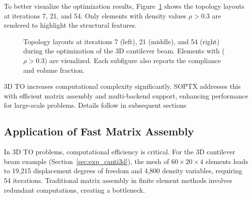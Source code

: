 \documentclass[mathpazo]{cicp}
\begin{document}
To better visualize the optimization results, Figure~\ref{fig:canti3d_all} shows the topology layouts at iterations 7, 21, and 54. Only elements with density values $\rho>0.3$ are rendered to highlight the structural features.
\begin{figure}[htb]
	\centering
	\caption{Topology layouts at iterations 7 (left), 21 (middle), and 54 (right) during the optimization of the 3D cantilever beam. Elements with ($\rho > 0.3$) are visualized. Each subfigure also reports the compliance and volume fraction.}
	\label{fig:canti3d_all}
\end{figure}

3D TO increases computational complexity significantly. SOPTX addresses this with efficient matrix assembly and multi-backend support, enhancing performance for large-scale problems. Details follow in subsequent sections

\subsection{Application of Fast Matrix Assembly}
In 3D TO problems, computational efficiency is critical. For the 3D cantilever beam example (Section~\ref{sec:exp_canti3d}), the mesh of $60\times20\times4$ elements leads to 19,215 displacement degrees of freedom and 4,800 density variables, requiring 54 iterations. Traditional matrix assembly in finite element methods involves redundant computations, creating a bottleneck.
\end{document}
